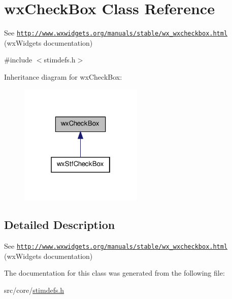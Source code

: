 \hypertarget{classwxCheckBox}{
\section{wxCheckBox Class Reference}
\label{classwxCheckBox}
}


See \href{http://www.wxwidgets.org/manuals/stable/wx_wxcheckbox.html}{\tt http://www.wxwidgets.org/manuals/stable/wx\_\-wxcheckbox.html} (wxWidgets documentation)  




{\ttfamily \#include $<$stimdefs.h$>$}



Inheritance diagram for wxCheckBox:
\nopagebreak
\begin{figure}[H]
\begin{center}
\leavevmode
\includegraphics[width=166pt]{classwxCheckBox__inherit__graph}
\end{center}
\end{figure}


\subsection{Detailed Description}
See \href{http://www.wxwidgets.org/manuals/stable/wx_wxcheckbox.html}{\tt http://www.wxwidgets.org/manuals/stable/wx\_\-wxcheckbox.html} (wxWidgets documentation) 

The documentation for this class was generated from the following file:\begin{DoxyCompactItemize}
\item 
src/core/\hyperlink{stimdefs_8h}{stimdefs.h}\end{DoxyCompactItemize}
